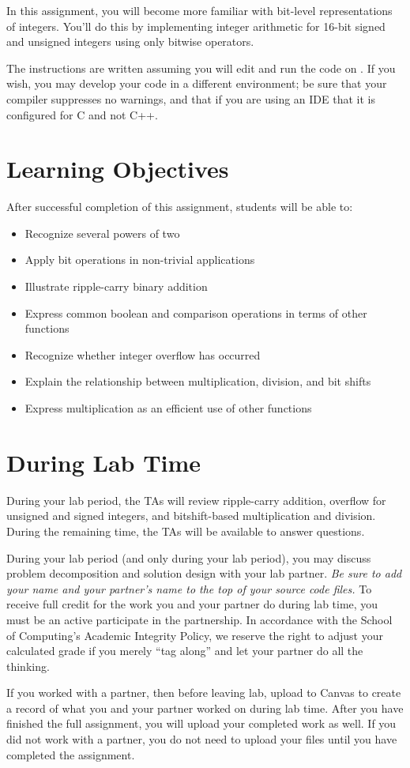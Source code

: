 In this assignment, you will become more familiar with bit-level representations of integers.
You'll do this by implementing integer arithmetic for 16-bit signed and unsigned integers using only bitwise operators.

The instructions are written assuming you will edit and run the code on \runtimeenvironment.
If you wish, you may develop your code in a different environment;
be sure that your compiler suppresses no warnings, and that if you are using an IDE that it is configured for C and not C++.

\tableofcontents

\section*{Learning Objectives}

After successful completion of this assignment, students will be able to:
\begin{itemize}
    \item Recognize several powers of two
    \item Apply bit operations in non-trivial applications
    \item Illustrate ripple-carry binary addition
    \item Express common boolean and comparison operations in terms of other functions
    \item Recognize whether integer overflow has occurred
    \item Explain the relationship between multiplication, division, and bit shifts
    \item Express multiplication as an efficient use of other functions
\end{itemize}

\section*{During Lab Time}

During your lab period, the TAs will review ripple-carry addition, overflow for unsigned and signed integers, and bitshift-based multiplication and division.
During the remaining time, the TAs will be available to answer questions.

During your lab period (and only during your lab period), you may discuss problem decomposition and solution design with your lab partner.
\textit{Be sure to add your name and your partner's name to the top of your source code files.}
To receive full credit for the work you and your partner do during lab time, you must be an active participate in the partnership.
In accordance with the School of Computing's Academic Integrity Policy, we reserve the right to adjust your calculated grade if you merely ``tag along'' and let your partner do all the thinking.

If you worked with a partner, then before leaving lab, upload \requiredfiles to Canvas to create a record of what you and your partner worked on during lab time.
After you have finished the full assignment, you will upload your completed work as well.
If you did not work with a partner, you do not need to upload your files until you have completed the assignment.
